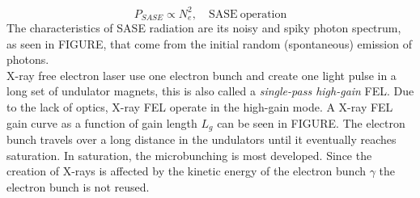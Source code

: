\begin{equation}
P_{SASE} \propto N_{e}^{2},\quad \mathrm{SASE\ operation}
\end{equation}
The characteristics of SASE radiation are its noisy and spiky photon spectrum, as seen in FIGURE, that come from the initial random (spontaneous) emission of photons.\\
X-ray free electron laser use one electron bunch and create one light pulse in a long set of undulator magnets, this is also called a \textit{single-pass high-gain} FEL. Due to the lack of optics, X-ray FEL operate in the high-gain mode. A X-ray FEL gain curve as a function of gain length $L_{g}$ can be seen in FIGURE. The electron bunch travels over a long distance in the undulators until it eventually reaches saturation. In saturation, the microbunching is most developed. Since the creation of X-rays is affected by the kinetic energy of the electron bunch $\gamma$ the electron bunch is not reused.

